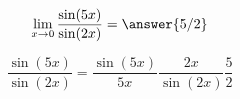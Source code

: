 \documentclass{ximera}
\author{Steven Gubkin}
\begin{document}
\begin{exercise}

\[\lim_{x \to 0} \frac{\sin(5x)}{\sin(2x)} = \answer{5/2}\]

\begin{hint}
	\[ \frac{\sin(5x)}{\sin(2x)} = \frac{\sin(5x)}{5x} \frac{2x}{\sin(2x)} \frac{5}{2}\]
\end{hint}

\end{exercise}
\end{document}
